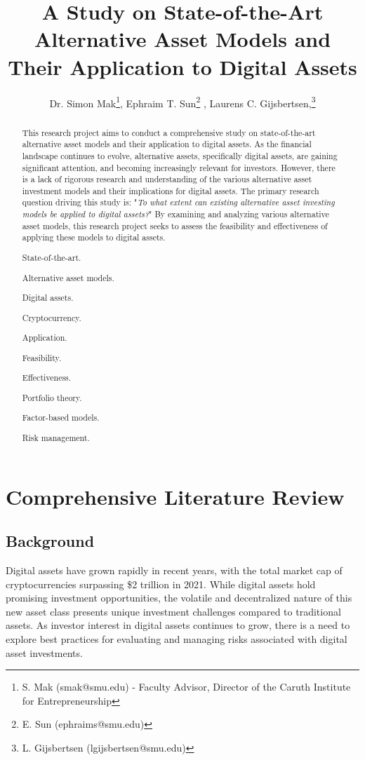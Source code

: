 \documentclass{ledger}
\title{A Study on State-of-the-Art Alternative Asset Models and Their Application to Digital Assets
}
\author{Dr. Simon Mak\thanks{S. Mak (smak@smu.edu) - Faculty Advisor, Director of the Caruth Institute for Entrepreneurship}, Ephraim T. Sun\thanks{E. Sun (ephraims@smu.edu)} , Laurens C. Gijsbertsen,\thanks{L. Gijsbertsen (lgijsbertsen@smu.edu)}}
\begin{document}
\maketitle

\thispagestyle{pagefirst}

\begin{abstract}
This research project aims to conduct a comprehensive study on state-of-the-art alternative asset models and their application to digital assets. As the financial landscape continues to evolve, alternative assets, specifically digital assets, are gaining significant attention, and becoming increasingly relevant for investors. However, there is a lack of rigorous research and understanding of the various alternative asset investment models and their implications for digital assets. The primary research question driving this study is: "\textit{To what extent can existing alternative asset investing models be applied to digital assets?}" By examining and analyzing various alternative asset models, this research project seeks to assess the feasibility and effectiveness of applying these models to digital assets.

\begin{keywords}
\item State-of-the-art.
\item Alternative asset models.
\item Digital assets.
\item Cryptocurrency.
\item Application.
\item Feasibility.
\item Effectiveness.
\item Portfolio theory.
\item Factor-based models.
\item Risk management.
\end{keywords}
\end{abstract}

\section{Comprehensive Literature Review}
\subsection{Background}
Digital assets have grown rapidly in recent years, with the total market cap of cryptocurrencies surpassing \$2 trillion in 2021. While digital assets hold promising investment opportunities, the volatile and decentralized nature of this new asset class presents unique investment challenges compared to traditional assets. As investor interest in digital assets continues to grow, there is a need to explore best practices for evaluating and managing risks associated with digital asset investments.
\end{document}
